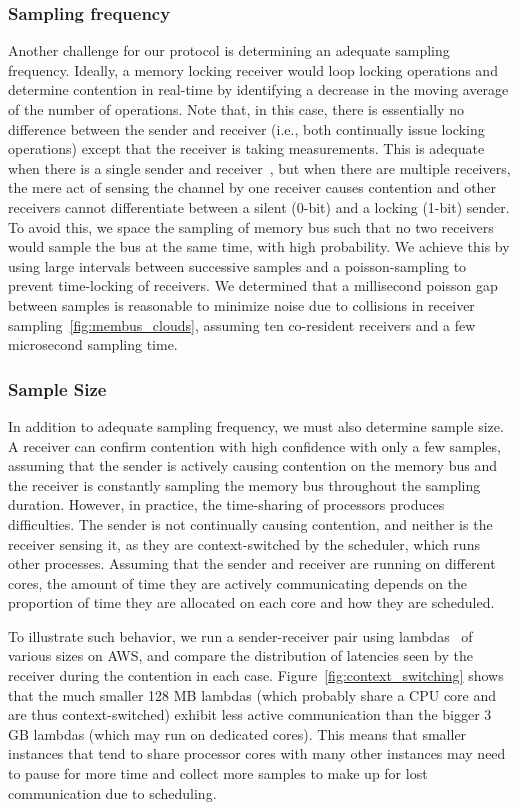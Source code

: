 \subsubsection{Sampling frequency}
Another challenge for our protocol is determining an adequate sampling
frequency. Ideally, a memory locking receiver would loop locking operations and
determine contention in real-time by identifying a decrease in the moving
average of the number of operations. Note that, in this case, there is
essentially no difference between the sender and receiver (i.e., both
continually issue locking operations) except that the receiver is taking
measurements. This is adequate when there is a single sender and
receiver~\cite{varadarajan2015}, but when there are multiple receivers, the mere
act of sensing the channel by one receiver causes contention and other receivers
cannot differentiate between a silent (0-bit) and a locking (1-bit) sender. To
avoid this, we space the sampling of memory bus such that no two receivers would
sample the bus at the same time, with high probability. We achieve this by
using large intervals between successive samples and a poisson-sampling to
prevent time-locking of receivers. We determined that a millisecond poisson gap
between samples is reasonable to minimize noise due to collisions in receiver
sampling~\ref{fig:membus_clouds}, assuming ten co-resident receivers and a few
microsecond sampling time.

\subsubsection{Sample Size} 
\label{sec:method:samplingdur}
In addition to adequate sampling frequency, we must also determine sample size.  
A receiver can confirm contention with high confidence with only a
few samples, assuming that the sender is actively causing contention on the
memory bus and the receiver is constantly sampling the memory bus throughout the
sampling duration. However, in practice, the time-sharing of processors
produces difficulties. The sender is not continually causing contention, and
neither is the receiver sensing it, as they are context-switched by the
scheduler, which runs other processes. Assuming that the sender and receiver are
running on different cores, the amount of time they are actively communicating
depends on the proportion of time they are allocated on each core and how they
are scheduled. 

To illustrate such behavior, we run a sender-receiver pair using
lambdas~\cite{awslambda} of various sizes on AWS, and compare the distribution
of latencies seen by the receiver during the contention in each case.
Figure~\ref{fig:context_switching} shows that the much smaller 128 MB lambdas
(which probably share a CPU core and are thus context-switched) exhibit less
active communication than the bigger 3 GB lambdas (which may run on dedicated
cores). This means that smaller instances that tend to share processor cores
with many other instances may need to pause for more time and collect more
samples to make up for lost communication due to scheduling.


